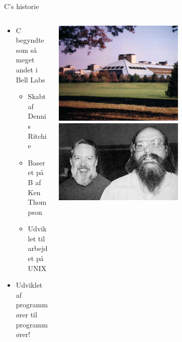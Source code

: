 \documentclass{beamer}
\begin{document}
\begin{frame}{C's historie}
	\begin{columns}
	
		\begin{column}{0.5\textwidth}
		\begin{itemize}
		\item {C begyndte som så meget andet i Bell Labs}
			\begin{itemize}
			\item{Skabt af Dennis Ritchie} %
			\item{Baseret på B af Ken Thompson} %
			\item{Udviklet til arbejdet på UNIX}
			\end{itemize}
		\item {Udviklet af programmører til programmører!}
		\end{itemize}
		\end{column}
		
		\begin{column}{0.5\textwidth}
		\begin{center}
     		\includegraphics[width=0.6\textwidth]{assets/Lucent_HQ.png} 					\break
     		\break
     		\includegraphics[width=0.6\textwidth]{assets/Ken_n_dennis.png}
     	\end{center}
		\end{column}
		
	\end{columns}
\end{frame}
\end{document}
